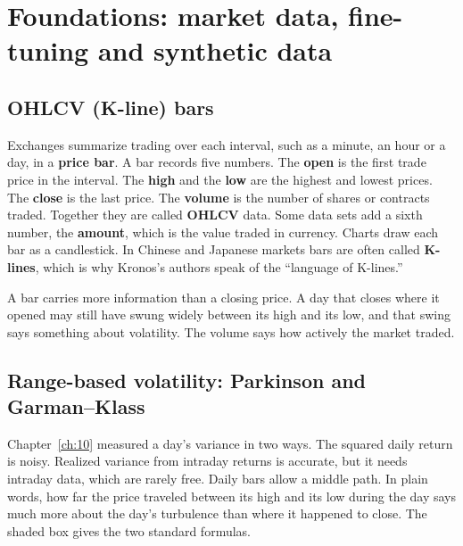 \section{Foundations: market data, fine-tuning and synthetic data}
\label{sec:23-foundations}

\subsection{OHLCV (K-line) bars}

Exchanges summarize trading over each interval, such as a minute, an hour or a day, in a \textbf{price bar}. A bar records five numbers. The \textbf{open} is the first trade price in the interval. The \textbf{high} and the \textbf{low} are the highest and lowest prices. The \textbf{close} is the last price. The \textbf{volume} is the number of shares or contracts traded. Together they are called \textbf{OHLCV} data. Some data sets add a sixth number, the \textbf{amount}, which is the value traded in currency. Charts draw each bar as a candlestick. In Chinese and Japanese markets bars are often called \textbf{K-lines}, which is why Kronos's authors speak of the ``language of K-lines.''

A bar carries more information than a closing price. A day that closes where it opened may still have swung widely between its high and its low, and that swing says something about volatility. The volume says how actively the market traded.

\subsection{Range-based volatility: Parkinson and Garman--Klass}

Chapter~\ref{ch:10} measured a day's variance in two ways. The squared daily return is noisy. Realized variance from intraday returns is accurate, but it needs intraday data, which are rarely free. Daily bars allow a middle path. In plain words, how far the price traveled between its high and its low during the day says much more about the day's turbulence than where it happened to close. The shaded box gives the two standard formulas.

